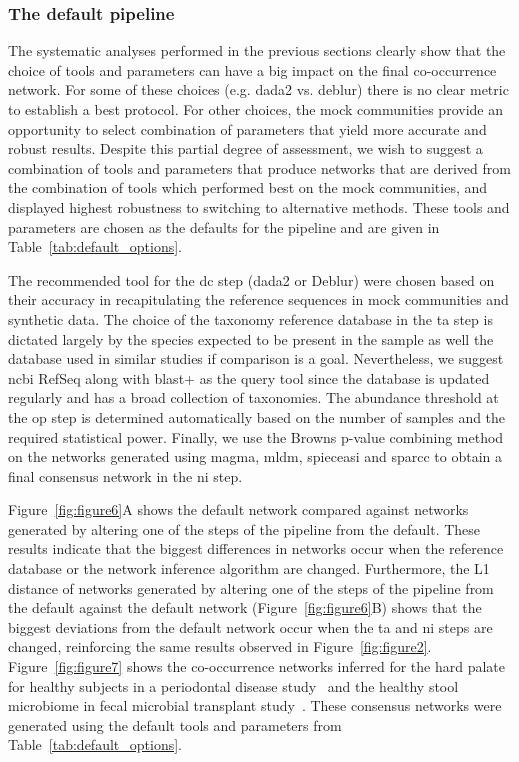   \FloatBarrier

  \subsubsection*{The default pipeline}

  The systematic analyses performed in the previous sections clearly show that the choice of tools and parameters can have a big impact on the final co-occurrence network. For some of these choices (e.g. \ac{dada2} vs. deblur) there is no clear metric to establish a best protocol.
  For other choices, the mock communities provide an opportunity to select combination of parameters that yield more accurate and robust results.
  Despite this partial degree of assessment, we wish to suggest a combination of tools and parameters that produce networks that are derived from the combination of tools which performed best on the mock communities, and displayed highest robustness to switching to alternative methods.
  These tools and parameters are chosen as the defaults for the pipeline and are given in Table~\ref{tab:default_options}.

  The recommended tool for the \ac{dc} step (\ac{dada2} or Deblur) were chosen based on their accuracy in recapitulating the reference sequences in mock communities and synthetic data.
  The choice of the taxonomy reference database in the \ac{ta} step is dictated largely by the species expected to be present in the sample as well the database used in similar studies if comparison is a goal.
  Nevertheless, we suggest \ac{ncbi} RefSeq along with blast+ as the query tool since the database is updated regularly and has a broad collection of taxonomies.
  The abundance threshold at the \ac{op} step is determined automatically based on the number of samples and the required statistical power.
  Finally, we use the Browns p-value combining method on the networks generated using \ac{magma}, \ac{mldm}, \ac{spieceasi} and \ac{sparcc} to obtain a final consensus network in the \ac{ni} step.

  Figure~\ref{fig:figure6}A shows the default network compared against networks generated by altering one of the steps of the pipeline from the default.
  These results indicate that the biggest differences in networks occur when the reference database or the network inference algorithm are changed.
  Furthermore, the L1 distance of networks generated by altering one of the steps of the pipeline from the default against the default network (Figure~\ref{fig:figure6}B) shows that the biggest deviations from the default network occur when the \ac{ta} and \ac{ni} steps are changed, reinforcing the same results observed in Figure~\ref{fig:figure2}. Figure~\ref{fig:figure7} shows the co-occurrence networks inferred for the hard palate for healthy subjects in a periodontal disease study~\cite{Chen2018} and the healthy stool microbiome in fecal microbial transplant study~\cite{Kang2017}. These consensus networks were generated using the default tools and parameters from Table~\ref{tab:default_options}.
